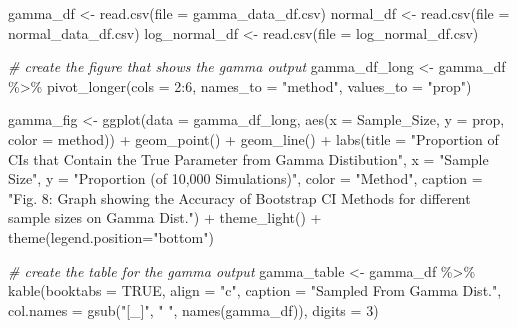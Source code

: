 \documentclass[12pt]{article}
\newenvironment{Shaded}{\begin{snugshade}}{\end{snugshade}}
\newcommand{\AttributeTok}[1]{\textcolor[rgb]{0.77,0.63,0.00}{#1}}
\newcommand{\CommentTok}[1]{\textcolor[rgb]{0.56,0.35,0.01}{\textit{#1}}}
\newcommand{\ConstantTok}[1]{\textcolor[rgb]{0.00,0.00,0.00}{#1}}
\newcommand{\DecValTok}[1]{\textcolor[rgb]{0.00,0.00,0.81}{#1}}
\newcommand{\FunctionTok}[1]{\textcolor[rgb]{0.00,0.00,0.00}{#1}}
\newcommand{\NormalTok}[1]{#1}
\newcommand{\OtherTok}[1]{\textcolor[rgb]{0.56,0.35,0.01}{#1}}
\newcommand{\SpecialCharTok}[1]{\textcolor[rgb]{0.00,0.00,0.00}{#1}}
\newcommand{\StringTok}[1]{\textcolor[rgb]{0.31,0.60,0.02}{#1}}
\begin{document}
\begin{Shaded}
\begin{Highlighting}[]
\NormalTok{gamma\_df }\OtherTok{\textless{}{-}} \FunctionTok{read.csv}\NormalTok{(}\AttributeTok{file =} \StringTok{\textquotesingle{}gamma\_data\_df.csv\textquotesingle{}}\NormalTok{)}
\NormalTok{normal\_df }\OtherTok{\textless{}{-}} \FunctionTok{read.csv}\NormalTok{(}\AttributeTok{file =} \StringTok{\textquotesingle{}normal\_data\_df.csv\textquotesingle{}}\NormalTok{)}
\NormalTok{log\_normal\_df }\OtherTok{\textless{}{-}} \FunctionTok{read.csv}\NormalTok{(}\AttributeTok{file =} \StringTok{\textquotesingle{}log\_normal\_df.csv\textquotesingle{}}\NormalTok{)}

\CommentTok{\# create the figure that shows the gamma output}
\NormalTok{gamma\_df\_long }\OtherTok{\textless{}{-}}\NormalTok{ gamma\_df }\SpecialCharTok{\%\textgreater{}\%}
  \FunctionTok{pivot\_longer}\NormalTok{(}\AttributeTok{cols =} \DecValTok{2}\SpecialCharTok{:}\DecValTok{6}\NormalTok{, }\AttributeTok{names\_to =} \StringTok{"method"}\NormalTok{, }\AttributeTok{values\_to =} \StringTok{"prop"}\NormalTok{) }
    
\NormalTok{gamma\_fig }\OtherTok{\textless{}{-}} \FunctionTok{ggplot}\NormalTok{(}\AttributeTok{data =}\NormalTok{ gamma\_df\_long, }
                    \FunctionTok{aes}\NormalTok{(}\AttributeTok{x =}\NormalTok{ Sample\_Size, }\AttributeTok{y =}\NormalTok{ prop, }\AttributeTok{color =}\NormalTok{ method)) }\SpecialCharTok{+} 
  \FunctionTok{geom\_point}\NormalTok{() }\SpecialCharTok{+} \FunctionTok{geom\_line}\NormalTok{() }\SpecialCharTok{+} 
  \FunctionTok{labs}\NormalTok{(}\AttributeTok{title =} \StringTok{"Proportion of CIs that Contain the True Parameter from Gamma }
\StringTok{       Distibution"}\NormalTok{, }\AttributeTok{x =} \StringTok{"Sample Size"}\NormalTok{, }
       \AttributeTok{y =} \StringTok{"Proportion (of 10,000 Simulations)"}\NormalTok{, }\AttributeTok{color =} \StringTok{"Method"}\NormalTok{,}
       \AttributeTok{caption =} \StringTok{"Fig. 8: Graph showing the Accuracy of Bootstrap CI Methods for different sample sizes on Gamma Dist."}\NormalTok{) }\SpecialCharTok{+}
  \FunctionTok{theme\_light}\NormalTok{() }\SpecialCharTok{+}
  \FunctionTok{theme}\NormalTok{(}\AttributeTok{legend.position=}\StringTok{"bottom"}\NormalTok{)}

\CommentTok{\# create the table for the gamma output}
\NormalTok{gamma\_table }\OtherTok{\textless{}{-}}\NormalTok{ gamma\_df }\SpecialCharTok{\%\textgreater{}\%}
  \FunctionTok{kable}\NormalTok{(}\AttributeTok{booktabs =} \ConstantTok{TRUE}\NormalTok{, }\AttributeTok{align =} \StringTok{"c"}\NormalTok{, }\AttributeTok{caption =} \StringTok{"Sampled From Gamma Dist."}\NormalTok{, }
        \AttributeTok{col.names =} \FunctionTok{gsub}\NormalTok{(}\StringTok{"[\_]"}\NormalTok{, }\StringTok{" "}\NormalTok{, }\FunctionTok{names}\NormalTok{(gamma\_df)), }\AttributeTok{digits =} \DecValTok{3}\NormalTok{) }
   

\end{Highlighting}
\end{Shaded}
\end{document}
